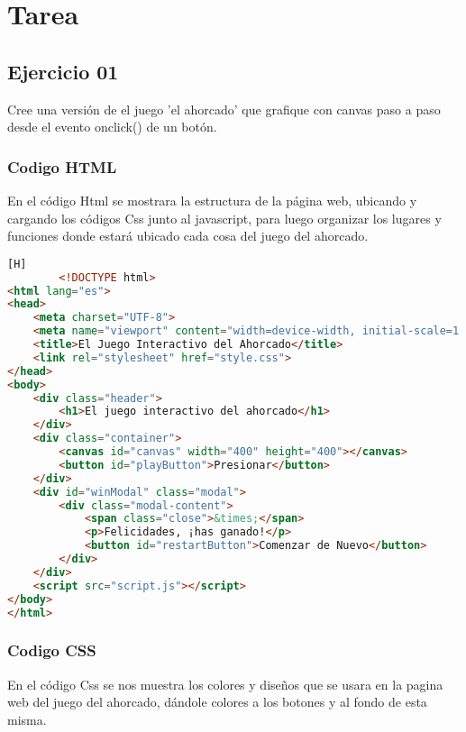 \documentclass[14pt]{article}
\begin{document}
    \section{Tarea}
    \subsection{Ejercicio 01}
    Cree una versión de el juego ’el ahorcado’ que grafique con canvas paso a paso desde el evento onclick() de un botón.
    \subsubsection{Codigo HTML}
    En el código Html se mostrara la estructura de la página web, ubicando y cargando los códigos Css junto al javascript, para luego organizar los lugares y funciones donde estará ubicado cada cosa del juego del ahorcado.

    \begin{lstlisting}[language=html,caption={Code HTML}][H]
		<!DOCTYPE html>
<html lang="es">
<head>
    <meta charset="UTF-8">
    <meta name="viewport" content="width=device-width, initial-scale=1.0">
    <title>El Juego Interactivo del Ahorcado</title>
    <link rel="stylesheet" href="style.css">
</head>
<body>
    <div class="header">
        <h1>El juego interactivo del ahorcado</h1>
    </div>
    <div class="container">
        <canvas id="canvas" width="400" height="400"></canvas>
        <button id="playButton">Presionar</button>
    </div>
    <div id="winModal" class="modal">
        <div class="modal-content">
            <span class="close">&times;</span>
            <p>Felicidades, ¡has ganado!</p>
            <button id="restartButton">Comenzar de Nuevo</button>
        </div>
    </div>
    <script src="script.js"></script>
</body>
</html>

	\end{lstlisting}

    \subsubsection{Codigo CSS}
    En el código Css se nos muestra los colores y diseños que se usara en la pagina web del juego del ahorcado, dándole colores a los botones y al fondo de esta misma. 
\end{document}
